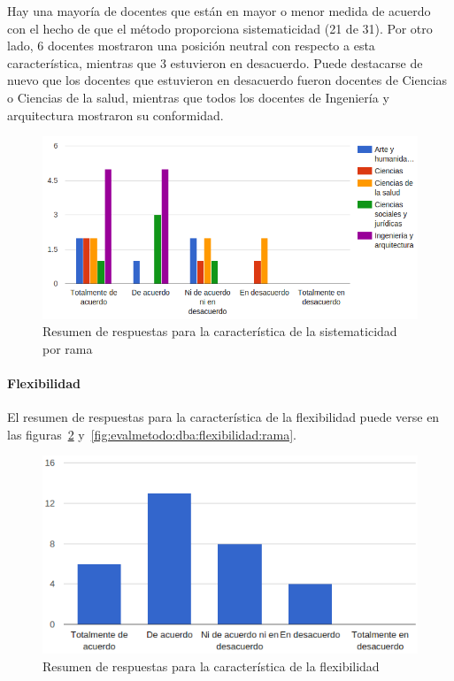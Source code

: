 Hay una mayoría de docentes que están en mayor o menor medida de acuerdo con el hecho de que el método proporciona sistematicidad (21 de 31). Por otro lado, 6 docentes mostraron una posición neutral con respecto a esta característica, mientras que 3 estuvieron en desacuerdo. Puede destacarse de nuevo que los docentes que estuvieron en desacuerdo fueron docentes de Ciencias o Ciencias de la salud, mientras que todos los docentes de Ingeniería y arquitectura mostraron su conformidad.

\begin{figure}[h]
  \begin{center}
    \includegraphics[scale=0.40]{C_DBA_sistematicidad_rama.png}
  \end{center}
  \caption{Resumen de respuestas para la característica de la sistematicidad por rama}
  \label{fig:evalmetodo:dba:sistematicidad:rama}
\end{figure}


\newpage
\paragraph*{Flexibilidad}

El resumen de respuestas para la característica de la flexibilidad puede verse en las figuras~\ref{fig:evalmetodo:dba:flexibilidad} y~\ref{fig:evalmetodo:dba:flexibilidad:rama}.

\begin{figure}[h]
  \begin{center}
    \includegraphics[scale=0.5]{C_DBA_flexibilidad.png}
  \end{center}
  \caption{Resumen de respuestas para la característica de la flexibilidad}
  \label{fig:evalmetodo:dba:flexibilidad}
\end{figure}


